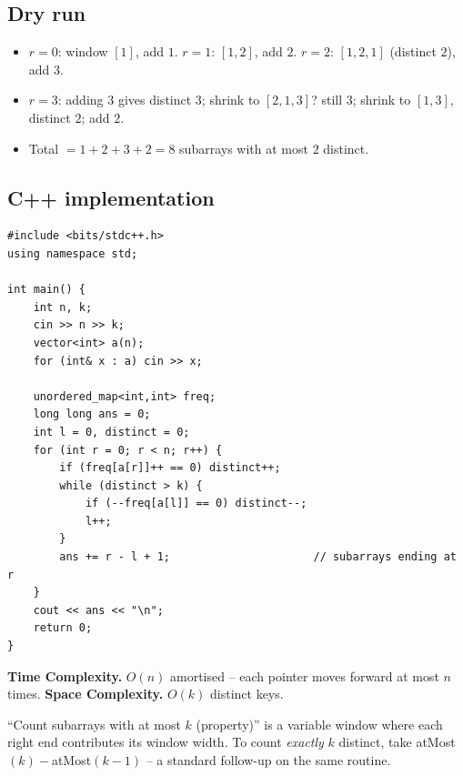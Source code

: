 \subsection*{Dry run}


\begin{itemize}
  \item $r=0$: window $[1]$, add $1$. $r=1$: $[1,2]$, add $2$. $r=2$:
        $[1,2,1]$ (distinct $2$), add $3$.
  \item $r=3$: adding $3$ gives distinct $3$; shrink to $[2,1,3]$? still
        $3$; shrink to $[1,3]$, distinct $2$; add $2$.
  \item Total $=1+2+3+2=8$ subarrays with at most $2$ distinct.
\end{itemize}

\subsection*{C++ implementation}

\begin{lstlisting}
#include <bits/stdc++.h>
using namespace std;

int main() {
    int n, k;
    cin >> n >> k;
    vector<int> a(n);
    for (int& x : a) cin >> x;

    unordered_map<int,int> freq;
    long long ans = 0;
    int l = 0, distinct = 0;
    for (int r = 0; r < n; r++) {
        if (freq[a[r]]++ == 0) distinct++;
        while (distinct > k) {
            if (--freq[a[l]] == 0) distinct--;
            l++;
        }
        ans += r - l + 1;                      // subarrays ending at r
    }
    cout << ans << "\n";
    return 0;
}
\end{lstlisting}

\begin{complexitybox}
\textbf{Time Complexity.} $O(n)$ amortised -- each pointer moves forward at
most $n$ times. \textbf{Space Complexity.} $O(k)$ distinct keys.
\end{complexitybox}

\begin{takeawaybox}
``Count subarrays with at most $k$ (property)'' is a variable window where
each right end contributes its window width. To count \emph{exactly} $k$
distinct, take atMost$(k)-$atMost$(k-1)$ -- a standard follow-up on the same
routine.
\end{takeawaybox}
